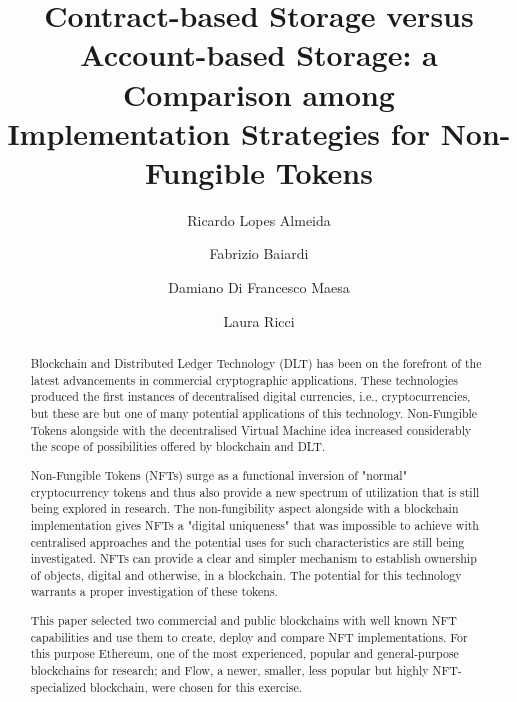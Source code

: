 \documentclass[10pt]{article}
\author[1]{Ricardo Lopes Almeida}
\author[2]{Fabrizio Baiardi}
\author[3]{Damiano Di Francesco Maesa}
\author[4]{Laura Ricci}
\affil[1, 2, 3, 4]{Dipartimento di Informatica, Università di Pisa, Italia}
\affil[1]{Università di Camerino, Italia}
\title{Contract-based Storage versus Account-based Storage: a Comparison among Implementation Strategies for Non-Fungible Tokens }
\begin{document}
\maketitle

\begin{abstract}
    Blockchain and Distributed Ledger Technology (DLT) has been on the forefront of the latest advancements in commercial cryptographic applications. These technologies produced the first instances of decentralised digital currencies, i.e., cryptocurrencies, but these are but one of many potential applications of this technology. Non-Fungible Tokens alongside with the decentralised Virtual Machine idea increased considerably the scope of possibilities offered by blockchain and DLT.
    \par
    Non-Fungible Tokens (NFTs) surge as a functional inversion of "normal" cryptocurrency tokens and thus also provide a new spectrum of utilization that is still being explored in research. The non-fungibility aspect alongside with a blockchain implementation gives NFTs a "digital uniqueness" that was impossible to achieve with centralised approaches and the potential uses for such characteristics are still being investigated. NFTs can provide a clear and simpler mechanism to establish ownership of objects, digital and otherwise, in a blockchain. The potential for this technology warrants a proper investigation of these tokens.
    \par
    This paper selected two commercial and public blockchains with well known NFT capabilities and use them to create, deploy and compare NFT implementations. For this purpose Ethereum, one of the most experienced, popular and general-purpose blockchains for research; and Flow, a newer, smaller, less popular but highly NFT-specialized blockchain, were chosen for this exercise.
    \par
\end{abstract}



















\printbibliography

\listoftodos
\end{document}
